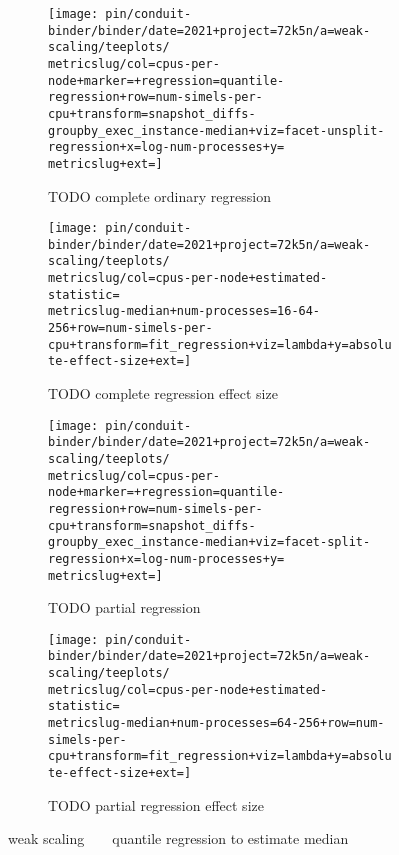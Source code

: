 \begin{figure*}
  \centering

  \begin{subfigure}[b]{0.5\textwidth}
    \centering
    \texttt{[image: pin/conduit-binder/binder/date=2021+project=72k5n/a=weak-scaling/teeplots/\\metricslug/col=cpus-per-node+marker=+regression=quantile-regression+row=num-simels-per-cpu+transform=snapshot\_diffs-groupby\_exec\_instance-median+viz=facet-unsplit-regression+x=log-num-processes+y=\\metricslug+ext=]}
    \caption{TODO complete ordinary regression}
    \label{fig:weak-scaling-regression-quantile-\metricslug-complete-regression}
  \end{subfigure}%
  \begin{subfigure}[b]{0.5\textwidth}
    \centering
    \texttt{[image: pin/conduit-binder/binder/date=2021+project=72k5n/a=weak-scaling/teeplots/\\metricslug/col=cpus-per-node+estimated-statistic=\\metricslug-median+num-processes=16-64-256+row=num-simels-per-cpu+transform=fit\_regression+viz=lambda+y=absolute-effect-size+ext=]}
    \caption{TODO complete regression effect size}
    \label{fig:weak-scaling-regression-quantile-\metricslug-complete-effect-size}
  \end{subfigure}

  \begin{subfigure}[b]{0.5\textwidth}
    \centering
    \texttt{[image: pin/conduit-binder/binder/date=2021+project=72k5n/a=weak-scaling/teeplots/\\metricslug/col=cpus-per-node+marker=+regression=quantile-regression+row=num-simels-per-cpu+transform=snapshot\_diffs-groupby\_exec\_instance-median+viz=facet-split-regression+x=log-num-processes+y=\\metricslug+ext=]}
    \caption{TODO partial regression}
    \label{fig:weak-scaling-regression-quantile-\metricslug-partial-regression}
  \end{subfigure}%
  \begin{subfigure}[b]{0.5\textwidth}
    \centering
    \texttt{[image: pin/conduit-binder/binder/date=2021+project=72k5n/a=weak-scaling/teeplots/\\metricslug/col=cpus-per-node+estimated-statistic=\\metricslug-median+num-processes=64-256+row=num-simels-per-cpu+transform=fit\_regression+viz=lambda+y=absolute-effect-size+ext=]}
    \caption{TODO partial regression effect size}
    \label{fig:weak-scaling-regression-quantile-\metricslug-partial-effect-size}
  \end{subfigure}
  \caption{weak scaling ~ \metric ~ quantile regression to estimate median}
  \label{fig:weak-scaling-regression-quantile-\metricslug}
\end{figure*}
